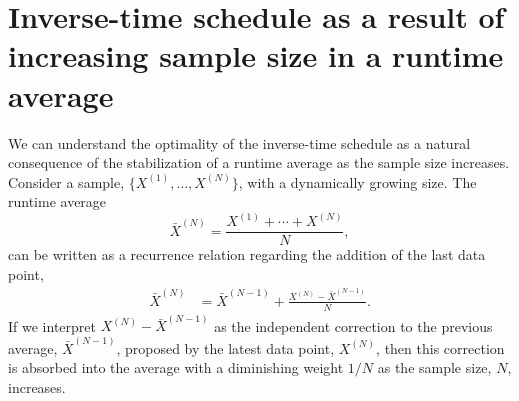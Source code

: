 \documentclass[reprint, superscriptaddress, floatfix]{revtex4-1}
\begin{document}
\appendix




\section{\label{sec:equilerr}
Inverse-time schedule as a result of increasing sample size
in a runtime average
}



We can understand the optimality of the inverse-time schedule
as a natural consequence of the stabilization of a runtime average
as the sample size increases\cite{
  marsili2006, barducci2008}.
%
Consider a sample, $\{X^{(1)}, \dots, X^{(N)}\}$,
with a dynamically growing size.
%
The runtime average
%
\begin{equation*}
  {\bar X}^{(N)}
  =
  \frac{ X^{(1)} + \cdots + X^{(N)} } { N }
  ,
\end{equation*}
%
can be written as a recurrence relation regarding
the addition of the last data point,
%
\begin{align}
  {\bar X}^{(N)}
  &=
  {\bar X}^{(N-1)} + \frac{ X^{(N)} - {\bar X}^{(N-1)} } { N }
  .
  \label{eq:av_recur}
\end{align}
%
If we interpret $X^{(N)} - {\bar X}^{(N-1)}$
as the independent correction to the previous average,
${\bar X}^{(N-1)}$, proposed by the latest data point, $X^{(N)}$,
then this correction is absorbed into the average with
a diminishing weight $1/N$ as the sample size, $N$, increases.
\end{document}
